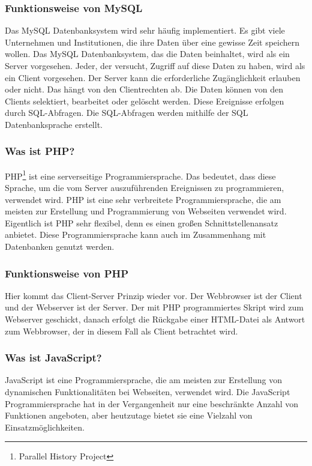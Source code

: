 \subsubsection{Funktionsweise von MySQL} 
Das MySQL Datenbanksystem wird sehr häufig implementiert. Es gibt viele Unternehmen und Institutionen, die ihre Daten über eine gewisse Zeit speichern wollen. Das MySQL Datenbanksystem, das die Daten beinhaltet, wird als ein Server vorgesehen. Jeder, der versucht, Zugriff auf diese Daten zu haben, wird als ein Client vorgesehen. Der Server kann die erforderliche Zugänglichkeit erlauben oder nicht. Das hängt von den Clientrechten ab. Die Daten können von den Clients selektiert, bearbeitet oder gelöscht werden. Diese Ereignisse erfolgen durch SQL-Abfragen. Die SQL-Abfragen werden mithilfe der SQL Datenbanksprache erstellt. \cite{50_mysql}
\subsubsection{Was ist PHP?} 
PHP\footnote{Parallel History Project} ist eine serverseitige Programmiersprache. Das bedeutet, dass diese Sprache, um 
die vom Server auszuführenden Ereignissen zu programmieren, verwendet wird. 
PHP ist eine sehr verbreitete Programmiersprache, die am meisten zur Erstellung und Programmierung von Webseiten verwendet wird. Eigentlich ist PHP sehr flexibel, denn es einen großen Schnittstellenansatz anbietet.  Diese Programmiersprache kann auch im Zusammenhang mit Datenbanken genutzt werden. \cite{50_php}
\subsubsection{Funktionsweise von PHP} 
Hier kommt das Client-Server Prinzip wieder vor. Der Webbrowser ist der Client und der Webserver ist der Server. Der mit PHP programmiertes Skript wird zum Webserver geschickt, danach erfolgt die Rückgabe einer HTML-Datei als Antwort zum Webbrowser, der in diesem Fall als Client betrachtet wird. \cite{50_php}
\subsubsection{Was ist JavaScript?} 
JavaScript ist eine Programmiersprache, die am meisten zur Erstellung von dynamischen Funktionalitäten bei Webseiten, verwendet wird. Die JavaScript Programmiersprache hat in der Vergangenheit nur eine beschränkte Anzahl von Funktionen angeboten, aber heutzutage bietet sie eine Vielzahl von Einsatzmöglichkeiten. \cite{50_javascript}
